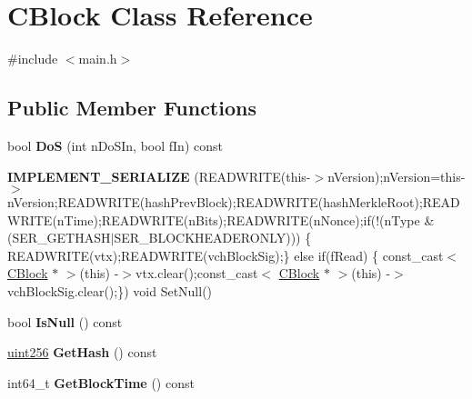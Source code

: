 \hypertarget{class_c_block}{}\section{C\+Block Class Reference}
\label{class_c_block}


{\ttfamily \#include $<$main.\+h$>$}

\subsection*{Public Member Functions}
\begin{DoxyCompactItemize}
\item 
\mbox{\label{class_c_block_a5e14734cd6352731b707f047781679e4}} 
bool {\bfseries DoS} (int n\+Do\+S\+In, bool f\+In) const
\item 
\mbox{\label{class_c_block_ac9e1497ee4362b15db0091154a3f4f7b}} 
{\bfseries I\+M\+P\+L\+E\+M\+E\+N\+T\+\_\+\+S\+E\+R\+I\+A\+L\+I\+ZE} (R\+E\+A\+D\+W\+R\+I\+TE(this-\/$>$n\+Version);n\+Version=this-\/$>$n\+Version;R\+E\+A\+D\+W\+R\+I\+TE(hash\+Prev\+Block);R\+E\+A\+D\+W\+R\+I\+TE(hash\+Merkle\+Root);R\+E\+A\+D\+W\+R\+I\+TE(n\+Time);R\+E\+A\+D\+W\+R\+I\+TE(n\+Bits);R\+E\+A\+D\+W\+R\+I\+TE(n\+Nonce);if(!(n\+Type \&(S\+E\+R\+\_\+\+G\+E\+T\+H\+A\+SH$\vert$S\+E\+R\+\_\+\+B\+L\+O\+C\+K\+H\+E\+A\+D\+E\+R\+O\+N\+LY))) \{ R\+E\+A\+D\+W\+R\+I\+TE(vtx);R\+E\+A\+D\+W\+R\+I\+TE(vch\+Block\+Sig);\} else if(f\+Read) \{ const\+\_\+cast$<$ \mbox{\hyperlink{class_c_block}{C\+Block}} $\ast$ $>$(this) -\/$>$vtx.\+clear();const\+\_\+cast$<$ \mbox{\hyperlink{class_c_block}{C\+Block}} $\ast$ $>$(this) -\/$>$vch\+Block\+Sig.\+clear();\}) void Set\+Null()
\item 
\mbox{\label{class_c_block_a2d5c3f93c0a699b003a55347d8b242cb}} 
bool {\bfseries Is\+Null} () const
\item 
\mbox{\label{class_c_block_a681acf1fa72ec2ed6c83ea5afc14e0f3}} 
\mbox{\hyperlink{classuint256}{uint256}} {\bfseries Get\+Hash} () const
\item 
\mbox{\label{class_c_block_a4fa8201373b08e0ee4b4c678b8f2c4aa}} 
int64\+\_\+t {\bfseries Get\+Block\+Time} () const
\item 
\mbox{\label{class_c_block_a71bb61e73b1ab6b7d4e1867a0d3a2cf8}} 

\end{DoxyCompactItemize}
